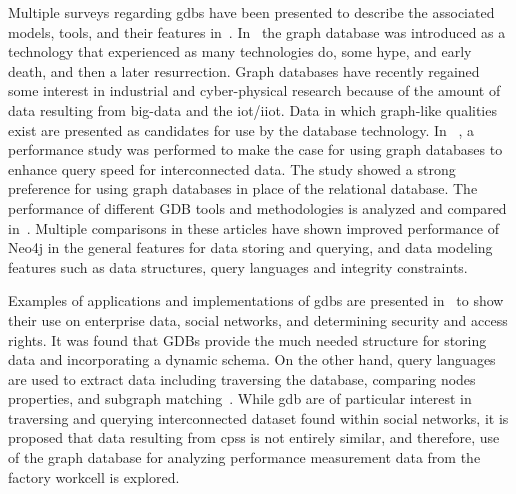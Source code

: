 Multiple surveys regarding \glspl{gdb} have been presented to describe the associated models, tools, and their features in~\cite{Angles:2008:SGD:1322432.1322433,7148480,GDB_overview}. In~\cite{Angles:2008:SGD:1322432.1322433} the graph database was introduced as a technology that experienced as many technologies do, some hype, and early death, and then a later resurrection.  Graph databases have recently regained some interest in industrial and cyber-physical research because of the amount of data resulting from big-data and the \gls{iot}/\gls{iiot}.  Data in which graph-like qualities exist are presented as candidates for use by the database technology.  In ~\cite{GDB_overview}, a performance study was performed to make the case for using graph databases to enhance query speed for interconnected data.  The study showed a strong preference for using graph databases in place of the relational database.  The performance of different GDB tools and methodologies is analyzed and compared in~\cite{Jadhav2015ComparativeAO,Macko:2013:PIG:2485732.2485750}. Multiple comparisons in these articles have shown improved performance of Neo4j in the general features for data storing and querying, and data modeling features such as data structures, query languages and integrity constraints.  

Examples of applications and implementations of \glspl{gdb} are presented in~\cite{modern_models} to show their use on enterprise data, social networks, and determining security and access rights. It was found that GDBs provide the much needed structure for storing data and incorporating a dynamic schema. On the other hand, query languages are used to extract data including traversing the database, comparing nodes properties, and subgraph matching~\cite{Wood2012QueryLF}. While \gls{gdb} are of particular interest in traversing and querying interconnected dataset found within social networks, it is proposed that data resulting from \glspl{cps} is not entirely similar, and therefore, use of the graph database for analyzing performance measurement data from the factory workcell is explored. 

